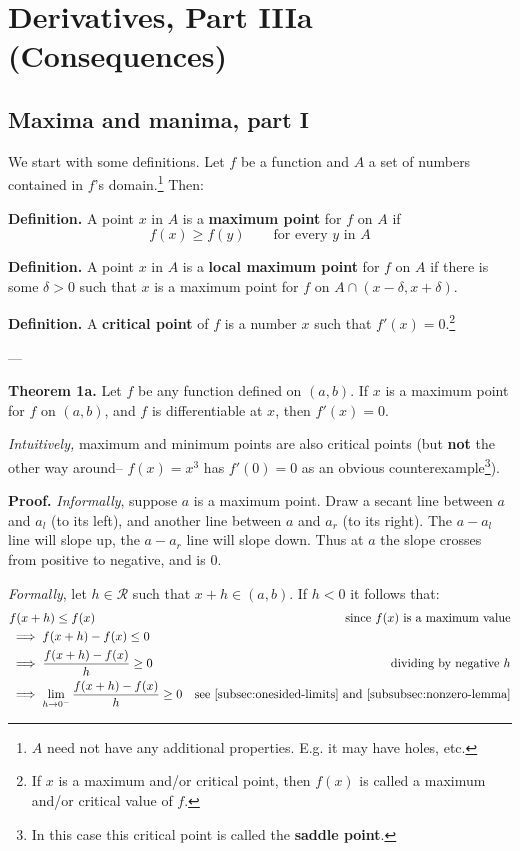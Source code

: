 
\section{Derivatives, Part IIIa (Consequences)}

\subsection{Maxima and manima, part I}
We start with some definitions. Let $f$ be a function and $A$ a set of
numbers contained in $f$'s domain.\footnote{$A$ need not have any
  additional properties. E.g. it may have holes, etc.} Then:

\vs

\textbf{Definition.} A point $x$ in $A$ is a \textbf{maximum
  point} for $f$ on $A$ if
\[f(x)\geq f(y)\qquad\text{for every $y$ in $A$}\]

\textbf{Definition.} A point $x$ in $A$ is a \textbf{local maximum
  point} for $f$ on $A$ if there is some $\delta>0$ such that $x$ is a
maximum point for $f$ on $A\cap(x-\delta, x+\delta)$.

\vs

\textbf{Definition.} A \textbf{critical point} of $f$ is a number $x$
such that $f'(x)=0$.\footnote{If $x$ is a maximum and/or critical
  point, then $f(x)$ is called a maximum and/or critical value of
  $f$.}

\vs---\vs

\textbf{Theorem 1a.} Let $f$ be any function defined on $(a,b)$. If $x$
is a maximum point for $f$ on $(a,b)$, and $f$ is differentiable at
$x$, then $f'(x)=0$.

\vs

\textit{Intuitively,} maximum and minimum points are also critical
points (but \textbf{not} the other way around-- $f(x)=x^3$ has
$f'(0)=0$ as an obvious counterexample\footnote{In this case this
  critical point is called the \textbf{saddle point}.}).

\vs

\textbf{Proof.} \textit{Informally}, suppose $a$ is a maximum point.
Draw a secant line between $a$ and $a_l$ (to its left), and another
line between $a$ and $a_r$ (to its right). The $a-a_l$ line will slope
up, the $a-a_r$ line will slope down. Thus at $a$ the slope crosses
from positive to negative, and is $0$.

\vs

\textit{Formally}, let $h\in\mathcal{R}$ such that $x+h\in(a,b)$. If $h<0$ it follows that:
\begin{align*}
  &f(x+h)\leq f(x)&\text{since $f(x)$ is a maximum value}\\
  &\implies f(x+h)-f(x)\leq 0\\
  &\implies\frac{f(x+h)-f(x)}{h}\geq0&\text{dividing by negative $h$}\\
  &\implies \lim_{h\to0^-}\frac{f(x+h)-f(x)}{h}\geq0&\text{see
                                                 \ref{subsec:onesided-limits}
                                                 and
                                                 \ref{subsubsec:nonzero-lemma}}
\end{align*}

